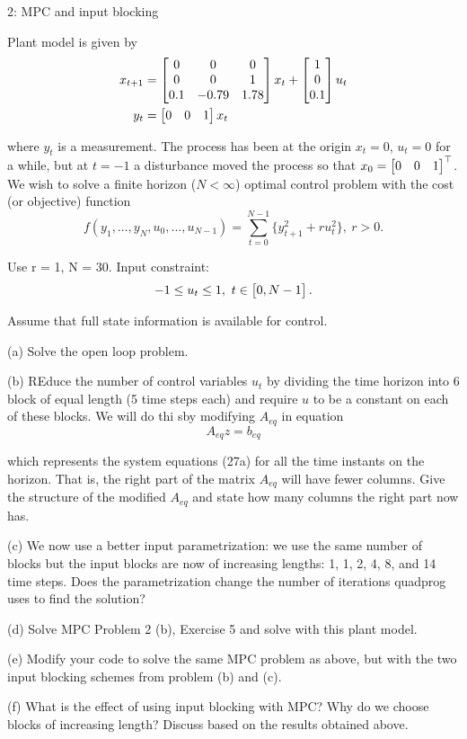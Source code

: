 
\begin{problem}{2: MPC and input blocking}

Plant model is given by 
\begin{align*}
  x_{t+1} &= \begin{bmatrix} 0 & 0 & 0 \\ 0 & 0 & 1 \\ 0.1 & -0.79 & 1.78 \end{bmatrix}x_t + \begin{bmatrix} 1 \\ 0 \\ 0.1 \end{bmatrix}u_t \\ 
  y_t &= \begin{bmatrix} 0 & 0 & 1 \end{bmatrix}x_t
\end{align*}

where $y_t$ is a measurement. The process has been at the origin $x_t = 0$, $u_t = 0$ for a while, but at $t = -1$ a 
disturbance moved the process so that $x_0 = \begin{bmatrix} 0 & 0 & 1 \end{bmatrix}^{\top}$. We wish to solve a finite horizon ($N < \infty$) optimal 
control problem with the cost (or objective) function 
\[
  f(y_1,\dots,y_N, u_0,\dots,u_{N-1}) = \sum_{t=0}^{N-1} \{y_{t+1}^2 + ru_t^2\} ,\ r > 0
.\] 

Use r = 1, N = 30. Input constraint:
\[
  -1 \leq u_t  \leq 1 ,\ t \in \begin{bmatrix} 0, N-1 \end{bmatrix}
.\] 

Assume that full state information is available for control. 

\medskip (a) Solve the open loop problem.

\medskip (b) REduce the number of control variables $u_t$ by dividing the time horizon into 6 
block of equal length (5 time steps each) and require $u$ to be a constant on each of these blocks. 
We will do thi sby modifying $A_{eq}$ in equation
\[
  A_{eq}z = b_{eq}
\] 

which represents the system equations (27a) for all the time instants on the horizon. That is, the
right part of the matrix $A_{eq}$ will have fewer columns. Give the structure of the modified $A_{eq}$ and state how many columns the right part now has. 

\medskip (c) We now use a better input parametrization: we use the same number of blocks but the input blocks are now of increasing lengths: 1, 1, 2, 4, 8, and 14 time steps. 
Does the parametrization change the number of iterations quadprog uses to find the solution?

\medskip (d) Solve MPC Problem 2 (b), Exercise 5 and solve with this plant model.

\medskip (e) Modify your code to solve the same MPC problem as above, but with the two input blocking 
schemes from problem (b) and (c).

\medskip (f) What is the effect of using input blocking with MPC? Why do we choose blocks of increasing length? 
Discuss based on the results obtained above. 


\end{problem}

